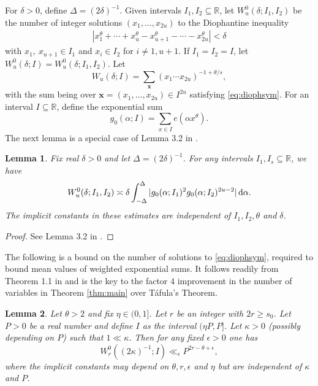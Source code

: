 \documentclass[11pt,reqno]{amsart}
\numberwithin{equation}{section}
\newtheorem{lemma}{Lemma}[section]
\renewcommand{\d}{\,{\rm d}}
\begin{document}
For $\delta > 0$, define $\Delta = (2\delta)^{-1}$. Given intervals $I_1,I_2 \subseteq \mathbb{R}$, let $W_u^0(\delta; I_1,I_2)$ be the number of integer solutions $(x_1,\ldots, x_{2u})$ to the Diophantine inequality 
\begin{align} \label{eq:diophsym}
|x_1^{\theta}+\cdots+x_u^{\theta}-x_{u+1}^{\theta}-\cdots-x_{2u}^{\theta}| < \delta 
\end{align}
with $x_1,\ x_{u+1} \in I_1$ and $x_i \in I_2$ for $i \neq 1, u+1$. If $I_1 = I_2 = I$, let $W_u^0(\delta;I) = W_u^0(\delta; I_1,I_2)$. 
Let 
\[ W_{u}(\delta;I) = \sum_{\mathbf{x}} (x_1\cdots x_{2u})^{-1+\theta/s}, \]
with the sum being over $\mathbf{x} = (x_1,\ldots,x_{2u}) \in I^{2u}$ satisfying \eqref{eq:diophsym}. 
For an interval $I \subseteq \mathbb{R}$, 
define the exponential sum 
\[ g_0(\alpha; I) = \sum_{x \in I} e(\alpha x^{\theta}). \] 
The next lemma is a special case of Lemma 3.2 in \cite{Poulias1}. 

\begin{lemma} \label{lem:poulcount}
Fix real $\delta > 0$ and let $\Delta = (2\delta)^{-1}$. For any intervals $I_1,I_s \subseteq \mathbb{R}$, we have 
\[ W_u^0(\delta; I_1,I_2) \asymp \delta \int_{-\Delta}^{\Delta} |g_0(\alpha;I_1)^2 g_0(\alpha;I_2)^{2u-2}|\d\alpha. \]
The implicit constants in these estimates are independent of $I_1,I_2, \theta$ and $\delta$. 
\end{lemma}

\begin{proof} See Lemma 3.2 in \cite{Poulias1}. 
\end{proof}



The following is a bound on the number of solutions to \eqref{eq:diophsym}, required to bound mean values of weighted exponential sums. It follows readily from Theorem 1.1 in \cite{BharMVE} and is the key to the factor $4$ improvement in the number of variables in Theorem \ref{thm:main} over T\'{a}fula's Theorem. 
\begin{lemma} \label{lem:unweight}
Let $\theta > 2$ and fix $ \eta \in (0, 1]$. Let $r$ be an integer with $2r \geq s_0$. Let $P > 0$ be a real number and define $I$ as the interval $(\eta P, P]$. Let $\kappa > 0 $ (possibly depending on $P$) such that $1 \ll \kappa$. Then for any fixed $\epsilon >0$ one has 
\[  W_r^0((2\kappa)^{-1};I) \ll_{\epsilon} P^{2r-\theta+\epsilon}, \]
where the implicit constants may depend on $\theta, r, \epsilon$ and $\eta$ but are independent of $\kappa$ and $P$.
\end{lemma}
\end{document}
